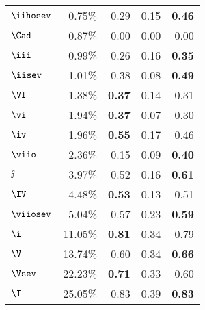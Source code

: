 \begin{tabular}{l|rrrr}
$\iihosev$   & 0.75\%                 & 0.29                 & 0.15                        & \textbf{0.46}  \\
$\Cad$       & 0.87\%                 & 0.00                 & 0.00                        & 0.00           \\
$\iii$       & 0.99\%                 & 0.26                 & 0.16                        & \textbf{0.35}  \\
$\iisev$     & 1.01\%                 & 0.38                 & 0.08                        & \textbf{0.49}  \\
$\VI$        & 1.38\%                 & \textbf{0.37}        & 0.14                        & 0.31           \\
$\vi$        & 1.94\%                 & \textbf{0.37}        & 0.07                        & 0.30           \\
$\iv$        & 1.96\%                 & \textbf{0.55}        & 0.17                        & 0.46           \\
$\viio$      & 2.36\%                 & 0.15                 & 0.09                        & \textbf{0.40}  \\
$\ii$        & 3.97\%                 & 0.52                 & 0.16                        & \textbf{0.61}  \\
$\IV$        & 4.48\%                 & \textbf{0.53}        & 0.13                        & 0.51           \\
$\viiosev$   & 5.04\%                 & 0.57                 & 0.23                        & \textbf{0.59}  \\
$\i$         & 11.05\%                & \textbf{0.81}        & 0.34                        & 0.79           \\
$\V$         & 13.74\%                & 0.60                 & 0.34                        & \textbf{0.66}  \\
$\Vsev$      & 22.23\%                & \textbf{0.71}        & 0.33                        & 0.60           \\
$\I$         & 25.05\%                & 0.83                 & 0.39                        & \textbf{0.83}     
\end{tabular}
